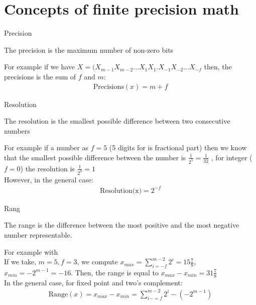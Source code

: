     \section{Concepts of finite precision math}
    \begin{parag}{Precision}
    \begin{definition}
        The precision is the maximum number of non-zero bits
    \end{definition}
    For example if we have $X = (X_{m-1}X_{m-2} \dots X_1 X_1 . X_{-1}X_{-2} \dots X_{-f}$ then, the precisions is the sum of $f$ and $m$:
    \begin{align*}
        \text{Precisions}(x) = m + f
    \end{align*}
    
    
    \end{parag}
   \begin{parag}{Resolution}
       \begin{definition}
           The resolution is the smallest possible difference between two consecutive numbers
       \end{definition}
       For example if a number as $f = 5$ (5 digits for is fractional part) then we know that the smallest possible difference between the number is $ \frac{1}{2^5} = \frac{1}{32}$ , for integer ($f = 0$) the resolution is $ \frac{1}{2^0} = 1$
   \\
   However, in the general case:
   \begin{align*}
       \text{Resolution(x)} = 2^{-f}
   \end{align*}

   
   \end{parag}
    
\begin{parag}{Rang}
    \begin{definition}
        The range is the difference between the most positive and the most negative number representable.
    \end{definition}
    For example with 
    \\
    If we take, $m = 5, f = 3$, we compute $x_{max} = \sum_{i=-f}^{m-2}2^i = 15 \frac{7}{8}$, $x_{min} = -2^{m-1} = -16$. Then, the range is equal to $x_{max} - x_{min} = 31 \frac{7}{8}$
\\
In the general case, for fixed point and two's complement:
\begin{align*}
    \text{Range}(x) = x_{max} - x_{min} = \sum_{i-=f}^{m-2} 2^i - (-2^{m-1})
\end{align*}
\end{parag}
